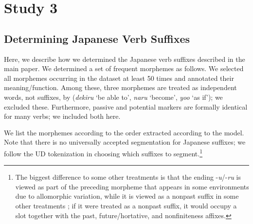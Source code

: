\documentclass[11pt,letterpaper]{article}
\begin{document}
\section{Study 3}

\subsection{Determining Japanese Verb Suffixes}

Here, we describe how we determined the Japanese verb suffixes described in the main paper.
We determined a set of frequent morphemes as follows.
We selected all morphemes occurring in the dataset at least 50 times and annotated their meaning/function.
Among these, three morphemes are treated as independent words, not suffixes, by \cite{kaiser2013japanese} (\textit{dekiru} `be able to', \textit{naru} `become', \textit{yoo} `as if'); we excluded these.
Furthermore, passive and potential markers are formally identical for many verbs; we included both here.

We list the morphemes according to the order extracted according to the model.
Note that there  is no universally accepted segmentation for Japanese suffixes; we follow the UD tokenization in choosing which suffixes to segment.\footnote{The biggest difference to some other treatments is that the ending -\textit{u}/-\textit{ru} is viewed as part of the preceding morpheme that appears in some environments due to allomorphic variation, while it is viewed as a nonpast suffix in some other treatments \citep[p.116]{hasegawa2014japanese}; if it were treated as a nonpast suffix, it would occupy a slot together with the past, future/hortative, and nonfiniteness affixes.}
\end{document}
